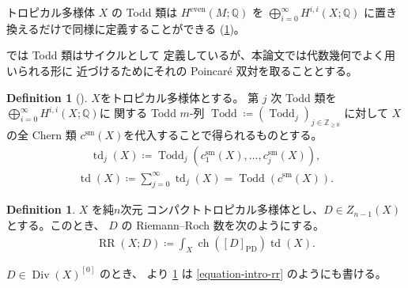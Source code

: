 \documentclass[a4paper,dvipdfmx,reqno,12pt]{amsart}
\theoremstyle{definition}
\newtheorem{definition}[theorem]{Definition}
\newcommand{\deq}{\coloneqq}
\newcommand{\opn}[1]{\operatorname{#1}}
\newcommand{\PD}[1]{[#1]_{\mathrm{PD}}}
\numberwithin{equation}{section}
\begin{document}
トロピカル多様体 $X$ の Todd 類は
$H^{\mathrm{even}}(M;\mathbb{Q})$ を
$\bigoplus_{i=0}^{\infty} H^{i,i}(X;\mathbb{Q})$
に置き換えるだけで同様に定義することができる
(\cref{definition-tropical-todd})。

\cite{demedrano2023chern} では Todd 類はサイクルとして
定義しているが、本論文では代数幾何でよく用いられる形に
近づけるためにそれの Poincar\'e 双対を取ることとする。

\begin{definition}[{\cite{demedrano2023chern}}]
\label{definition-tropical-todd}
$X$をトロピカル多様体とする。
第 $j$ 次 Todd 類を
$\bigoplus_{i=0}^{\infty} H^{i,i}(X;\mathbb{Q})$に
関する Todd $m$-列 $\opn{Todd}\deq (\opn{Todd}_j)_{j\in \mathbb{Z}_{\geq 0}}$
に対して
$X$ の全 Chern 類
$c^{\mathrm{sm}}(X)$を代入することで得られるものとする。
\begin{align}
\opn{td}_j(X)\deq \opn{Todd}_j(c_{1}^{\mathrm{sm}}(X),
\ldots,c_{j}^{\mathrm{sm}}(X)),
\end{align}
\begin{align}
\opn{td}(X)\deq \sum_{j=0}^{\infty}\opn{td}_j(X)=
\opn{Todd}(c^{\mathrm{sm}}(X)).
\end{align}

\end{definition}



\begin{definition}
\label{definition-rr-number}
$X$ を純$n$次元
コンパクトトロピカル多様体とし、$D\in Z_{n-1}(X)$
とする。このとき、
$D$ の Riemann--Roch 数を次のようにする。
\begin{align}
\opn{RR}(X;D)\deq \int_X \opn{ch}(\PD{D})\opn{td}(X).
\end{align}
\end{definition}
$D\in \opn{Div}(X)^{[0]}$ のとき、
\cite[Proposition 5.12]{MR4637248} より
\cref{definition-rr-number} は
\cref{equation-intro-rr} のようにも書ける。
\end{document}

